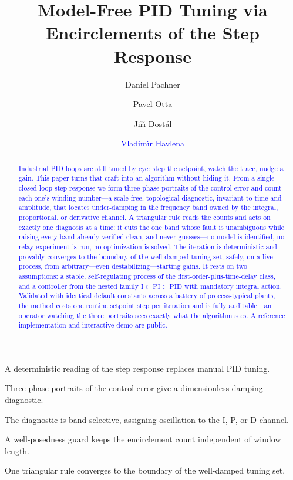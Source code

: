 \documentclass[final,3p,times,twocolumn]{elsarticle}
\newcommand{\rev}[1]{\textcolor{blue}{#1}}  %
\newcommand{\revg}[1]{\textcolor{blue}{#1}} %
\begin{document}
\begin{frontmatter}

\title{Model-Free PID Tuning via Encirclements of the Step Response}

\author[inst1]{Daniel Pachner}
\author[inst1]{Pavel Otta}
\author[inst1]{Ji\v{r}\'{\i} Dost\'al}
\author[inst2]{\rev{Vladim\'{\i}r Havlena}}



\begin{abstract}
\rev{Industrial PID loops are still tuned by eye: step the
setpoint, watch the trace, nudge a gain. This paper turns that craft
into an algorithm without hiding it. From a single closed-loop step
response we form three phase portraits of the control error and count
each one's winding number---a scale-free, \revg{topological} diagnostic, invariant to time
and amplitude, that locates under-damping in the frequency band owned
by the integral, proportional, or derivative channel. A triangular
rule reads the counts and acts on exactly one diagnosis at a time: it
cuts the one band whose fault is unambiguous while raising every band
already verified clean, and never guesses---no model is identified, no
relay experiment is run, no optimization is solved. The iteration is
deterministic and provably converges to the boundary of the
well-damped tuning set, safely, on a live process, from
arbitrary---even destabilizing---starting gains. It rests on two
assumptions: a stable, self-regulating process of the
first-order-plus-time-delay class, and a controller from the nested
family $\mathrm{I} \subset \mathrm{PI} \subset \mathrm{PID}$ with
mandatory integral action. Validated with identical default constants
across a battery of process-typical plants, the method costs one
routine setpoint step per iteration and is fully auditable---an
operator watching the three portraits sees exactly what the algorithm
sees. A reference implementation and interactive demo are public.}
\end{abstract}

\begin{highlights}
\item A deterministic reading of the step response replaces manual PID
tuning.
\item Three phase portraits of the control error give a dimensionless
damping diagnostic.
\item The diagnostic is band-selective, assigning oscillation to the I,
P, or D channel.
\item A well-posedness guard keeps the encirclement count independent
of window length.
\item One triangular rule converges to the boundary of the well-damped
tuning set.
\end{highlights}


\end{frontmatter}
\end{document}
